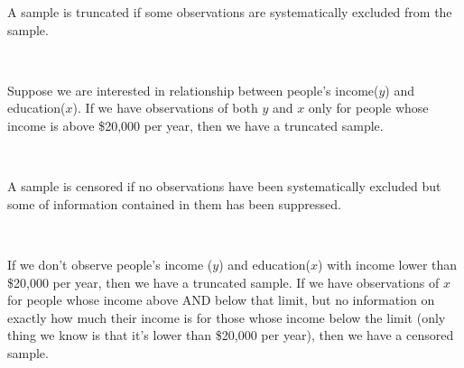 \begin{definition}[Truncated]
    A sample is truncated if some observations are systematically excluded from
the sample.
\end{definition}

\begin{eg}
    \

    Suppose we are interested in relationship between people's income($y$) and education($x$). 
    If we have observations of both $y$ and $x$ only for people whose income is above \$20,000 per year,
    then we have a truncated sample. 
\end{eg}

\begin{definition}[Censored]
    \

    A sample is censored if no observations have been systematically excluded but some of information contained in them has been suppressed.
\end{definition}

\begin{eg}
    \

    If we don't observe people's income ($y$) and education($x$)
    with income lower than \$20,000 per year, then we have a truncated sample.
    If we have observations of $x$ for people whose income above AND below that limit,
    but no information on exactly how much their income is for those whose income below the limit 
    (only thing we know is that it's lower than \$20,000 per year), then we have a censored sample.
\end{eg}

